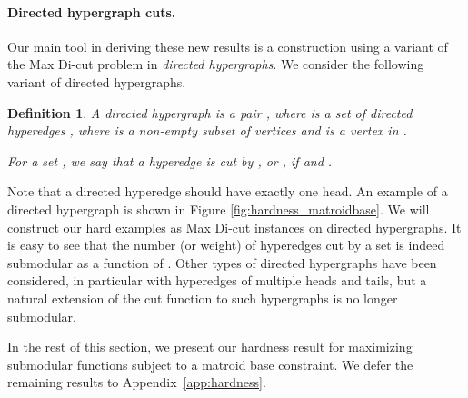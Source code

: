 \documentclass{article}[11pt]
\newtheorem{definition}[theorem]{Definition}
\begin{document}
\paragraph{Directed hypergraph cuts.}
Our main tool in deriving these new results is a construction using a variant of the Max Di-cut
problem in {\em directed hypergraphs}. We consider the following variant of directed
hypergraphs.


\begin{definition}
A directed hypergraph is a pair , where  is a set of directed hyperedges
, where  is a non-empty subset of vertices and  is
a vertex in . 

For a set , we say that a hyperedge  is cut by , or ,
if  and .
\end{definition}

Note that a directed hyperedge should have exactly one head. 
An example of a directed hypergraph is shown in Figure \ref{fig:hardness_matroidbase}.
We will construct our hard examples as Max Di-cut instances on directed hypergraphs.
It is easy to see that the number (or weight) of  hyperedges cut by a set   is indeed submodular
 as a function of .
Other types of directed hypergraphs have been considered, in particular
with hyperedges of multiple heads and tails, but a natural extension of the cut
function to such hypergraphs is no longer submodular.

In the rest of this section, 
we present our hardness result 
for maximizing submodular functions subject to a matroid base constraint.
We defer the remaining results to Appendix~\ref{app:hardness}.


\iffalse
\subsection{Submodular maximization over matroid bases}
\label{subsec:matroidbase}
First we consider the problem of maximizing a submodular function subject
to a matroid base constraint. Vondrak in \cite{Vondrak09} proved a hardness
factor of  when the base packing number \cite[Definition 1.2]{Vondrak09}
of the matroid is . Roughly speaking, the base packing number is the
maximum number of disjoint bases of the matroid that can be embedded in an instance of the problem.
On the other hand, when there are two disjoint bases (i.e. ),
the best known hardness result is 0.5 which is the hardness of approximating any symmetric submodular function \cite{FMV07}. We show that submodular maximizing problem when the base packing number is at least 2 is  strictly harder than the unconstrained case by showing that it can not be approximated better than 0.393.
\fi
\end{document}
